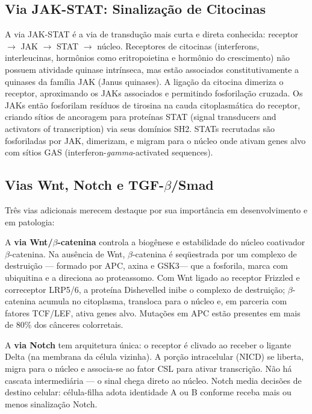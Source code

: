 \subsection{Via JAK-STAT: Sinalização de Citocinas}
\label{subsec:09-jakstat}

A via JAK-STAT é a via de transdução mais curta e direta conhecida: receptor
$\to$ JAK $\to$ STAT $\to$ núcleo. Receptores de citocinas (interferons,
interleucinas, hormônios como eritropoietina e hormônio do crescimento) não
possuem atividade quinase intrínseca, mas estão associados constitutivamente a
quinases da família JAK (Janus quinases). A ligação da citocina dimeriza o
receptor, aproximando os JAKs associados e permitindo fosforilação cruzada.
Os JAKs então fosforilam resíduos de tirosina na cauda citoplasmática do
receptor, criando sítios de ancoragem para proteínas STAT (signal transducers
and activators of transcription) via seus domínios SH2. STATs recrutadas são
fosforiladas por JAK, dimerizam, e migram para o núcleo onde ativam genes
alvo com sítios GAS (interferon-\textit{gamma}-activated sequences).

\subsection{Vias Wnt, Notch e TGF-$\beta$/Smad}
\label{subsec:09-wtnnotch}

Três vias adicionais merecem destaque por sua importância em desenvolvimento
e em patologia:

A \textbf{via Wnt/$\beta$-catenina} controla a biogênese e estabilidade do
núcleo coativador $\beta$-catenina. Na ausência de Wnt, $\beta$-catenina é
seqüestrada por um complexo de destruição --- formado por APC, axina e GSK3---
que a fosforila, marca com ubiquitina e a direciona ao proteassomo. Com Wnt
ligado ao receptor Frizzled e correceptor LRP5/6, a proteína Dishevelled
inibe o complexo de destruição; $\beta$-catenina acumula no citoplasma,
transloca para o núcleo e, em parceria com fatores TCF/LEF, ativa genes
alvo. Mutações em APC estão presentes em mais de 80\% dos cânceres
colorretais.

A \textbf{via Notch} tem arquitetura única: o receptor é clivado ao receber o
ligante Delta (na membrana da célula vizinha). A porção intracelular (NICD)
se liberta, migra para o núcleo e associa-se ao fator CSL para ativar
transcrição. Não há cascata intermediária --- o sinal chega direto ao núcleo.
Notch media decisões de destino celular: célula-filha adota identidade A ou B
conforme receba mais ou menos sinalização Notch.

